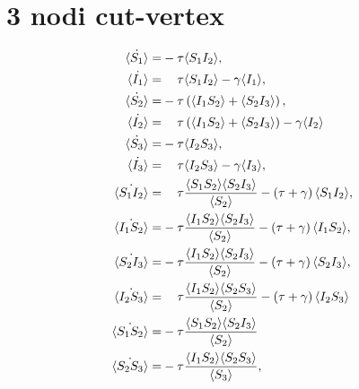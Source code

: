 \documentclass{report}
\begin{document}
\section{3 nodi cut-vertex}
\begin{equation*}
\begin{aligned}
\dot{\angol {S_1}} = & -\tau \angol{ S_1 I_2}, \\
	\dot{\angol {I_1}} = & \spa \tau \angol{S_1 I_2}-\gamma \angol{I_1}, \\
	\dot{\angol {S_2}} = & -\tau \tonde{ \angol{ I_1 S_2} + \angol{S_2I_3}},	\\
	\dot{\angol {I_2}} = &\spa \tau \tonde{ \angol{ I_1 S_2} + \angol{S_2I_3}}-\gamma \angol{I_2}\\
	\dot{\angol {S_3}} = & -\tau \angol{ I_2 S_3},\\	\dot{\angol {I_3}} = & \spa \tau \angol{ I_2 S_3}-\gamma \angol{I_3},\\
 	\dot{\angol{S_1I_2}}=&\spa\tau\frac{\angol{S_1S_2}\angol{S_2I_3}}{\angol{S_2}} - \tonde{ \tau + \gamma}\angol{S_1 I_2},
\\
	\dot{\angol{I_1S_2}}=&-\tau\frac{\angol{I_1S_2}\angol{S_2I_3}}{\angol{S_2}} - \tonde{ \tau + \gamma}\angol{I_1 S_2},
\\
	\dot{\angol{S_2I_3}}=&-\tau\frac{\angol{I_1S_2}\angol{S_2I_3}}{\angol{S_2}} - \tonde{ \tau + \gamma}\angol{S_2 I_3},
\\
	\dot{\angol{I_2S_3}}=&\spa\tau\frac{\angol{I_1S_2}\angol{S_2S_3}}{\angol{S_2}} - \tonde{ \tau + \gamma}\angol{I_2 S_3}\\
	\dot{\angol{S_1S_2}} = &- \tau\frac{\angol{S_1S_2}\angol{S_2I_3}}{\angol{S_2}}\\
	\dot{\angol{S_2S_3}}= & -\tau \frac{\angol{ I_1 S_2}\angol{S_2S_3}}{\angol{S_3}}, 
\end{aligned}
\end{equation*}
\end{document}
